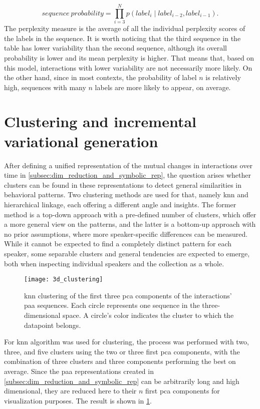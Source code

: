 %
\begin{equation}
	sequence\ probability = \prod_{i=3}^{N} p(label_i \mid label_{i-2}, label_{i-1}).
\end{equation}
\noindent
%
The perplexity measure is the average of all the individual perplexity scores of the labels in the sequence.
It is worth noticing that the third sequence in the table has lower variability than the second sequence, although its overall probability is lower and its mean perplexity is higher.
That means that, based on this model, interactions with lower variability are not necessarily more likely.
On the other hand, since in most contexts, the probability of label $n$ is relatively high, sequences with many $n$ labels are more likely to appear, on average.

\section{Clustering and incremental variational generation}
\label{sec:clustering_and_incremental_generation}

After defining a unified representation of the mutual changes in interactions over time in \cref{subsec:dim_reduction_and_symbolic_rep}, the question arises whether clusters can be found in these representations to detect general similarities in behavioral patterns.
Two clustering methods are used for that, namely \ac{knn} and hierarchical linkage, each offering a different angle and insights.
The former method is a top-down approach with a pre-defined number of clusters, which offer a more general view on the patterns, and the latter is a bottom-up approach with no prior assumptions, where more speaker-specific differences can be measured.
While it cannot be expected to find a completely distinct pattern for each speaker, some separable clusters and general tendencies are expected to emerge, both when inspecting individual speakers and the collection as a whole.
%
\begin{figure}[t]
	\centering
	\texttt{[image: 3d\_clustering]}
	\caption[3D \ac{knn} clustering of mutual changes \acs{pca} components]
		{\ac{knn} clustering of the first three \ac{pca} components of the interactions' \ac{paa} sequences.
		 Each circle represents one sequence in the three-dimensional space.
		 A circle's color indicates the cluster to which the datapoint belongs.}
	\label{fig:knn_clustering}
\end{figure}
%
For \ac{knn} algorithm was used for clustering, the process was performed with two, three, and five clusters using the two or three first \ac{pca} components, with the combination of three clusters and three components performing the best on average.
Since the \ac{paa} representations created in \cref{subsec:dim_reduction_and_symbolic_rep} can be arbitrarily long and high dimensional, they are reduced here to their $n$ first \ac{pca} components for visualization purposes.
The result is shown in \cref{fig:knn_clustering}.

